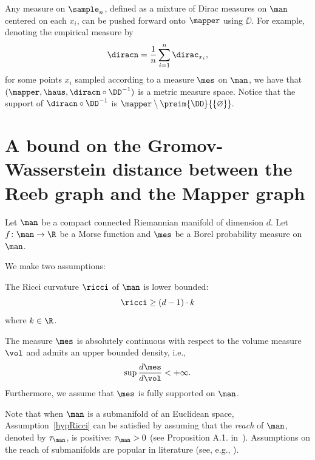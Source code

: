   
 \medskip 
 
 Any measure on $\sample_n$, defined as a mixture of Dirac measures on $\man$ centered on each $x_i$, can be pushed forward onto $\mapper$ using $\DD$. For example, denoting the empirical measure by $$\diracn=\frac{1}{n}\sum_{i=1}^n \dirac_{x_i},$$
for some points $x_i$ sampled according to a measure $\mes$ on $\man$, we have that $(\mapper,\haus,\diracn\circ\DD^{-1})$ is a metric measure space.
%
Notice that the support of $\diracn\circ\DD^{-1}$ is 
 $\mapper\setminus \preim{\DD}{\left\{\varnothing\right\}}.$ 

\section{A bound on the Gromov-Wasserstein distance between the Reeb graph and the Mapper graph}\label{sec:mapper}



Let $\man$ be a compact connected Riemannian manifold of dimension $d$. Let  $f\colon\man\rightarrow\R$ be a Morse function and $\mes$ be a Borel probability measure on $\man$.

We make two assumptions:

 \begin{hypothesis} \label{hypRicci}
    The Ricci curvature $\ricci$ of $\man$ is lower bounded: $$\ricci\geq(d-1)\cdot k  $$
    where $k \in \R$.
\end{hypothesis}

\begin{hypothesis}\label{hypdensity}
	The measure $\mes$ is absolutely continuous with respect to the volume measure $\vol$ and admits an upper bounded density, i.e., $$\sup\frac{d\mes}{d\vol}<+\infty.$$ Furthermore, we assume that $\mes$ is fully supported on $\man$.  
\end{hypothesis}

Note that when $\man$ is a submanifold of an Euclidean space, Assumption~\ref{hypRicci} can be satisfied by assuming that the {\em reach} of $\man$, denoted by $\tau_{\man}$, is positive: $\tau_{\man}>0$ (see Proposition A.1. in~\cite{aamari2019estimating}). Assumptions on the reach of submanifolds are popular in literature (see, e.g., \cite{niyogi2008finding,burgisser2018computing}). 

